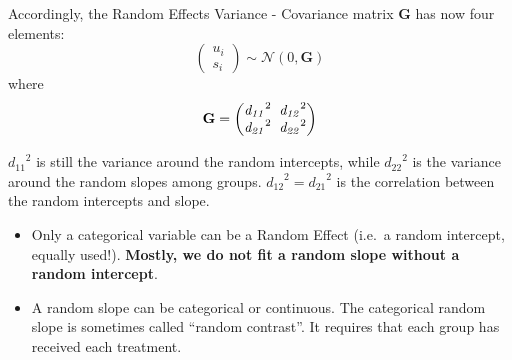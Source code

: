 \documentclass{beamer}
\begin{document}
\begin{frame}
\frametitle{}
Accordingly, the Random Effects Variance - Covariance matrix $\mathbf{G}$ has now four elements:
\[
\begin{pmatrix}
\mathit{u_i} \\
\mathit{s_i}
\end{pmatrix}
\sim \mathcal{N}(0, \mathbf{G})
\]
where
\[
\mathbf{G} = 
\begin{pmatrix}
\mathit{d_{11}}^2 \hspace{0.2cm} \mathit{d_{12}}^2 \\
\mathit{d_{21}}^2 \hspace{0.2cm} \mathit{d_{22}}^2
\end{pmatrix}
\]
\vspace{0.2cm}

$\mathit{d_{11}}^2$ is still the variance around the random intercepts, while $\mathit{d_{22}}^2$ is the variance around the random slopes among groups. $\mathit{d_{12}}^2 = \mathit{d_{21}}^2$ is the correlation between the random intercepts and slope.
\end{frame}

\begin{frame}
\large
\begin{itemize}
    \item Only a categorical variable can be a Random Effect (i.e.~a random intercept, equally used!). \textbf{Mostly, we do not fit a random slope without a random intercept}.
    \item A random slope can be categorical or continuous. The categorical random slope is sometimes called “random contrast”. It requires that each group has received each treatment. 
\end{itemize}
\end{frame}
\end{document}
